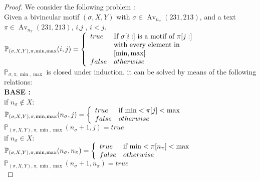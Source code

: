 \documentclass[a4paper]{llncs}
\DeclareMathOperator{\Avd}{Av}
\newcommand\Av[2]{\Avd_{{#1}}({#2})}
\newcommand{\ptext}{\pi}
\newcommand{\pmotif}{\sigma}
\newcommand{\x}{X}
\newcommand{\y}{Y}
\newcommand{\bmotif}{(\sigma,\x,\y)}
\begin{document}
			\begin{proof}
			We consider the following problem :\\
			
			Given a bivincular motif $\bmotif$ with $\pmotif \in \Av{n_\pmotif}{231,213} $, and a text $\ptext \in \Av{n_\ptext}{231,213}$, $i$,$j$ , $i<j$.\\
			
			$\mathbb{P}_{\bmotif,\ptext,\min,\max}(i,j)= \left\{ 
				\begin{array}{l l}
					true & \text{If $\pmotif[i:]$ is a motif of $\ptext[j:]$}\\
						& \text{with every element in}\\ 
						&[\min,\max]\\
		
					false & otherwise\\
				\end{array} \right.$\\
		
		
		
		
			$\mathbb{P}_{\pmotif,\ptext,\min,\max}$ is closed under induction. 
			it can be
			solved by means of the following relations:\\
			
			
			\textbf{BASE :} \\
			
			if $n_\pmotif \notin  \x : $\\		
			$\mathbb{P}_{\bmotif,\ptext,\min,\max}(n_\pmotif,j)= \left\{ 
					\begin{array}{l l}
						true & \text{if $\min<\ptext[j]<\max$
						}\\
						false & otherwise\\
					\end{array} \right. $\\	
			$\mathbb{P}_{\bmotif,\ptext,\min,\max}(n_\pmotif+1,j)= true $\\
			
			if $n_\pmotif \in  \x : $\\		
			$\mathbb{P}_{\bmotif,\ptext,\min,\max}(n_\pmotif,n_\ptext)= \left\{ 
					\begin{array}{l l}
						true & \text{if $\min<\ptext[n_\ptext]<\max$
						}\\
						false & otherwise\\
					\end{array} \right. $\\	
			$\mathbb{P}_{\bmotif,\ptext,\min,\max}(n_\pmotif+1,n_\ptext)= true $\\
			

\end{proof}
\end{document}
